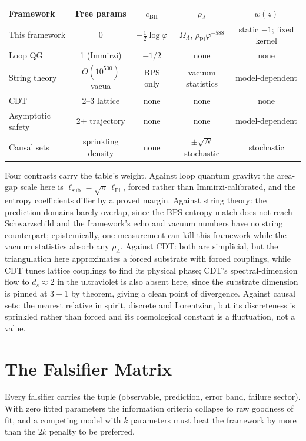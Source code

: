 \documentclass[11pt,letterpaper]{article}
\theoremstyle{definition}
\newcommand{\phiG}{\varphi}
\newcommand{\Pl}{\mathrm{Pl}}
\newcommand{\bsub}{\mathrm{sub}}
\newcommand{\BH}{\mathrm{BH}}
\newcommand{\half}{\tfrac{1}{2}}
\begin{document}
\begin{center}
\footnotesize
\begin{tabular}{lcccc}
\toprule
\textbf{Framework} & \textbf{Free params}
& $c_\BH$ & $\rho_\Lambda$ & $w(z)$ \\
\midrule
This framework & 0 & $-\half\log\phiG$
& $\Omega_\Lambda$, $\rho_\Pl\phiG^{-588}$
& static $-1$; fixed kernel \\
Loop QG & 1 (Immirzi) & $-1/2$ & none & none \\
String theory & $O(10^{500})$ vacua & BPS only & vacuum statistics
& model-dependent \\
CDT & 2--3 lattice & none & none & none \\
Asymptotic safety & 2+ trajectory & none & none & model-dependent \\
Causal sets & sprinkling density & none & $\pm\sqrt N$ stochastic
& stochastic \\
\bottomrule
\end{tabular}
\end{center}

Four contrasts carry the table's weight.  Against loop quantum
gravity: the area-gap scale here is $\ell_\bsub=\sqrt\pi\,\ell_\Pl$,
forced rather than Immirzi-calibrated, and the entropy coefficients
differ by a proved margin.  Against string theory: the prediction
domains barely overlap, since the BPS entropy match does not reach
Schwarzschild and the framework's echo and vacuum numbers have no
string counterpart; epistemically, one measurement can kill this
framework while the vacuum statistics absorb any $\rho_\Lambda$.
Against CDT: both are simplicial, but the triangulation here
approximates a forced substrate with forced couplings, while CDT
tunes lattice couplings to find its physical phase; CDT's
spectral-dimension flow to $d_s\approx2$ in the ultraviolet is also
absent here, since the substrate dimension is pinned at $3{+}1$ by
theorem, giving a clean point of divergence.  Against causal sets: the
nearest relative in spirit, discrete and Lorentzian, but its
discreteness is sprinkled rather than forced and its cosmological
constant is a fluctuation, not a value.

\section{The Falsifier Matrix}
\label{sec:falsifier}

Every falsifier carries the tuple (observable, prediction, error
band, failure sector).  With zero fitted parameters the information
criteria collapse to raw goodness of fit, and a competing model with
$k$ parameters must beat the framework by more than the $2k$ penalty
to be preferred.
\end{document}
